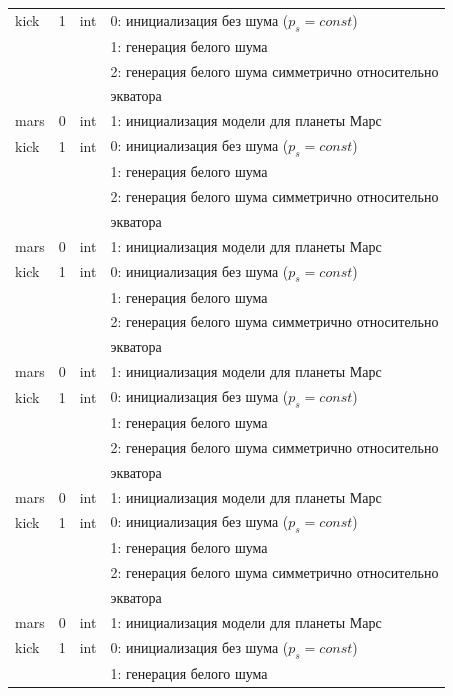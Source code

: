 \begin{longtable*}[c]{|l|c|l|l|}
    kick & 1 & int & 0: инициализация без шума (\(p_s = const\)) \\
    &   &     & 1: генерация белого шума                  \\
    &   &     & 2: генерация белого шума симметрично относительно \\
    & & & экватора    \\
    mars & 0 & int & 1: инициализация модели для планеты Марс     \\
    kick & 1 & int & 0: инициализация без шума (\(p_s = const\)) \\
    &   &     & 1: генерация белого шума                  \\
    &   &     & 2: генерация белого шума симметрично относительно \\
    & & & экватора    \\
    mars & 0 & int & 1: инициализация модели для планеты Марс     \\
    kick & 1 & int & 0: инициализация без шума (\(p_s = const\)) \\
    &   &     & 1: генерация белого шума                  \\
    &   &     & 2: генерация белого шума симметрично относительно \\
    & & & экватора    \\
    mars & 0 & int & 1: инициализация модели для планеты Марс     \\
    kick & 1 & int & 0: инициализация без шума (\(p_s = const\)) \\
    &   &     & 1: генерация белого шума                  \\
    &   &     & 2: генерация белого шума симметрично относительно \\
    & & & экватора    \\
    mars & 0 & int & 1: инициализация модели для планеты Марс     \\
    kick & 1 & int & 0: инициализация без шума (\(p_s = const\)) \\
    &   &     & 1: генерация белого шума                  \\
    &   &     & 2: генерация белого шума симметрично относительно \\
    & & & экватора    \\
    mars & 0 & int & 1: инициализация модели для планеты Марс     \\
    kick & 1 & int & 0: инициализация без шума (\(p_s = const\)) \\
    &   &     & 1: генерация белого шума                  \\

\end{longtable*}
